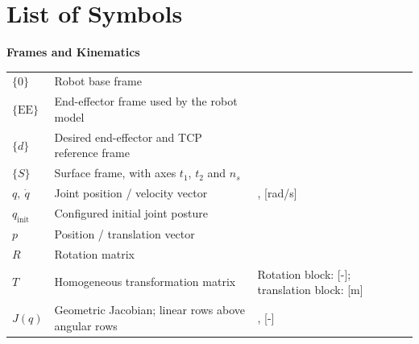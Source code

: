 \chapter*{List of Symbols}


\renewcommand{\arraystretch}{1.2}
\newcommand{\symrow}[3]{#1 & #2 & #3\\}
\newcommand{\symgroup}[2]{%
  \needspace{3\baselineskip}%
  \par\noindent\textbf{#1}\par\nobreak
  \begingroup
  \setlength{\LTpre}{2pt}%
  \setlength{\LTpost}{0.9em}%
  \begin{longtable}{@{}
  >{\raggedright\arraybackslash}p{3.9cm}
  >{\raggedright\arraybackslash}p{6.5cm}
  >{\raggedright\arraybackslash}p{4.2cm}@{}}%
  #2
  \end{longtable}%
  \endgroup}

\symgroup{Frames and Kinematics}{
\symrow{$\{0\}$}{Robot base frame}{[-]}
\symrow{$\{\mathrm{EE}\}$}{End-effector frame used by the robot model}{[-]}
\symrow{$\{d\}$}{Desired end-effector and TCP reference frame}{[-]}
\symrow{$\{S\}$}{Surface frame, with axes $t_1$, $t_2$ and $n_s$}{[-]}
\symrow{$q,\ \dot{q}$}{Joint position / velocity vector}{[rad], [rad/s]}
\symrow{$q_{\mathrm{init}}$}{Configured initial joint posture}{[rad]}
\symrow{$p$}{Position / translation vector}{[m]}
\symrow{$R$}{Rotation matrix}{[-]}
\symrow{$T$}{Homogeneous transformation matrix}{Rotation block: [-]; translation block: [m]}
\symrow{$J(q)$}{Geometric Jacobian; linear rows above angular rows}{[m/rad], [-]}
}

